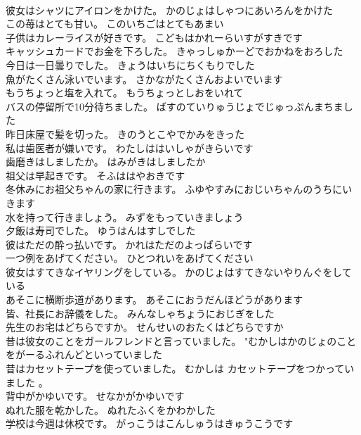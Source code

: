 \documentclass[8pt]{extreport}
\begin{document}
\begin{CJK}{UTF8}{min}
\\	彼女はシャツにアイロンをかけた。	かのじょはしゃつにあいろんをかけた 
\\	この苺はとても甘い。	このいちごはとてもあまい 
\\	子供はカレーライスが好きです。	こどもはかれーらいすがすきです 
\\	キャッシュカードでお金を下ろした。	きゃっしゅかーどでおかねをおろした 
\\	今日は一日曇りでした。	きょうはいちにちくもりでした 
\\	魚がたくさん泳いでいます。	さかながたくさんおよいでいます 
\\	もうちょっと塩を入れて。	もうちょっとしおをいれて 
\\	バスの停留所で10分待ちました。	ばすのていりゅうじょでじゅっぷんまちました 
\\	昨日床屋で髪を切った。	きのうとこやでかみをきった 
\\	私は歯医者が嫌いです。	わたしははいしゃがきらいです 
\\	歯磨きはしましたか。	はみがきはしましたか 
\\	祖父は早起きです。	そふははやおきです 
\\	冬休みにお祖父ちゃんの家に行きます。	ふゆやすみにおじいちゃんのうちにいきます 
\\	水を持って行きましょう。	みずをもっていきましょう 
\\	夕飯は寿司でした。	ゆうはんはすしでした 
\\	彼はただの酔っ払いです。	かれはただのよっぱらいです 
\\	一つ例をあげてください。	ひとつれいをあげてください 
\\	彼女はすてきなイヤリングをしている。	かのじょはすてきないやりんぐをしている 
\\	あそこに横断歩道があります。	あそこにおうだんほどうがあります 
\\	皆、社長にお辞儀をした。	みんなしゃちょうにおじぎをした 
\\	先生のお宅はどちらですか。	せんせいのおたくはどちらですか 
\\	昔は彼女のことをガールフレンドと言っていました。	"むかしはかのじょのことをがーるふれんどといっていました 
\\	昔はカセットテープを使っていました。	むかしは カセットテープをつかっていました 。 
\\	背中がかゆいです。	せなかがかゆいです 
\\	ぬれた服を乾かした。	ぬれたふくをかわかした 
\\	学校は今週は休校です。	がっこうはこんしゅうはきゅうこうです 

\end{CJK}
\end{document}
